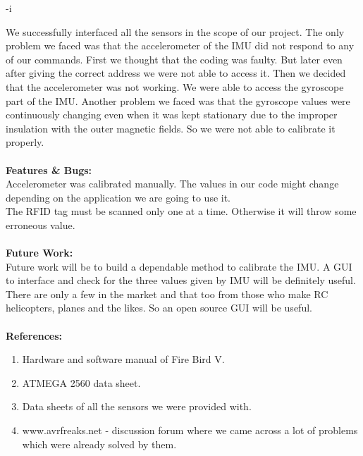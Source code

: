 -i\documentclass[a4paper,12 pt]{article}
\begin{document}
We successfully interfaced all the sensors in the scope of our project. The only problem we faced was that the accelerometer of the IMU did not respond to any of our commands. First we thought that the coding was faulty. But later even after giving the correct address we were not able to access it. Then we decided that the accelerometer was not working. We were able to access the gyroscope part of the IMU. Another problem we faced was that the gyroscope values were continuously changing even when it was kept stationary due to the improper insulation with the outer magnetic fields. So we were not able to calibrate it properly.  \\\\
 
\textbf{Features \& Bugs: }\\
Accelerometer was calibrated manually. The values in our code might change depending on the application we are going to use it.\\
The RFID tag must be scanned only one at a time. Otherwise it will throw some erroneous value.\\\\
 
\textbf{Future Work: }\\Future work will be to build a dependable method to calibrate the IMU. A GUI to interface and check for the three values given by IMU will be definitely useful. There are only a few in the market and that too from those who make RC helicopters, planes and the likes. So an open source GUI will be useful.\\\\ 
 
\textbf{References: }\\
\begin{enumerate}
				\item Hardware and software manual of Fire Bird V.
				\item ATMEGA 2560 data sheet.
				\item Data sheets of all the sensors we were provided with.
				\item www.avrfreaks.net - discussion forum where we came across a lot of problems which were already solved by them. 
\end{enumerate}
\end{document}
